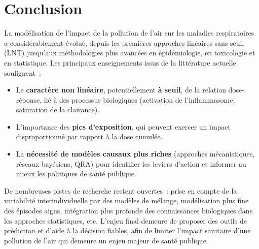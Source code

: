 \section{Conclusion}
\label{sec:Conclusion}
La modélisation de l’impact de la pollution de l’air sur les maladies respiratoires a considérablement évolué, depuis les premières approches linéaires sans seuil (LNT) jusqu’aux méthodologies plus avancées en épidémiologie, en toxicologie et en statistique. Les principaux enseignements issus de la littérature actuelle soulignent :
\begin{itemize}
	\item Le \textbf{caractère non linéaire}, potentiellement \textbf{à seuil}, de la relation dose-réponse, lié à des processus biologiques (activation de l’inflammasome, saturation de la clairance).
	\item L’importance des \textbf{pics d’exposition}, qui peuvent exercer un impact disproportionné par rapport à la dose cumulée.
	\item La \textbf{nécessité de modèles causaux plus riches} (approches mécanistiques, réseaux bayésiens, QRA) pour identifier les leviers d’action et informer au mieux les politiques de santé publique.
\end{itemize}

De nombreuses pistes de recherche restent ouvertes : prise en compte de la variabilité interindividuelle par des modèles de mélange, modélisation plus fine des épisodes aigus, intégration plus profonde des connaissances biologiques dans les approches statistiques, etc. L’enjeu final demeure de proposer des outils de prédiction et d’aide à la décision fiables, afin de limiter l’impact sanitaire d’une pollution de l’air qui demeure un enjeu majeur de santé publique.





